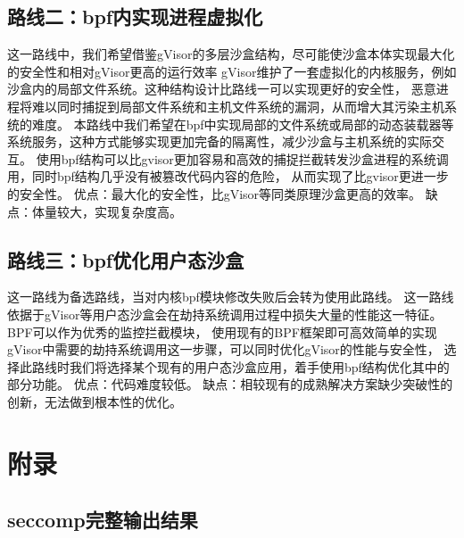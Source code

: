 \documentclass[AutoFakeBold,a4paper]{ctexart}
\begin{document}
\subsection{路线二：bpf内实现进程虚拟化}
这一路线中，我们希望借鉴gVisor的多层沙盒结构，尽可能使沙盒本体实现最大化的安全性和相对gVisor更高的运行效率
gVisor维护了一套虚拟化的内核服务，例如沙盒内的局部文件系统。这种结构设计比路线一可以实现更好的安全性，
恶意进程将难以同时捕捉到局部文件系统和主机文件系统的漏洞，从而增大其污染主机系统的难度。
本路线中我们希望在bpf中实现局部的文件系统或局部的动态装载器等系统服务，这种方式能够实现更加完备的隔离性，减少沙盒与主机系统的实际交互。
使用bpf结构可以比gvisor更加容易和高效的捕捉拦截转发沙盒进程的系统调用，同时bpf结构几乎没有被篡改代码内容的危险，
从而实现了比gvisor更进一步的安全性。
优点：最大化的安全性，比gVisor等同类原理沙盒更高的效率。
缺点：体量较大，实现复杂度高。

\subsection{路线三：bpf优化用户态沙盒}
这一路线为备选路线，当对内核bpf模块修改失败后会转为使用此路线。
这一路线依据于gVisor等用户态沙盒会在劫持系统调用过程中损失大量的性能这一特征。BPF可以作为优秀的监控拦截模块，
使用现有的BPF框架即可高效简单的实现gVisor中需要的劫持系统调用这一步骤，可以同时优化gVisor的性能与安全性，
选择此路线时我们将选择某个现有的用户态沙盒应用，着手使用bpf结构优化其中的部分功能。
优点：代码难度较低。
缺点：相较现有的成熟解决方案缺少突破性的创新，无法做到根本性的优化。







\section{附录}

\subsection{seccomp完整输出结果}


\end{document}
